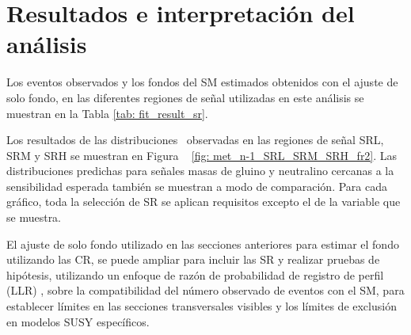 \chapter{Resultados e interpretación del análisis}




Los eventos observados y los fondos del SM estimados obtenidos con el ajuste de solo fondo, en las diferentes regiones de señal utilizadas en este análisis
se muestran en la Tabla \ref{tab: fit_result_sr}.

Los resultados de las distribuciones \met\ observadas en las regiones de señal SRL, SRM y SRH se muestran en
Figura ~ \ref{fig: met_n-1_SRL_SRM_SRH_fr2}. Las distribuciones predichas para señales masas de gluino y neutralino
 cercanas a la sensibilidad esperada también se muestran a modo de comparación. Para cada gráfico, toda la selección de SR
se aplican requisitos excepto el de la variable que se muestra.

El ajuste de solo fondo utilizado en las secciones anteriores para estimar el fondo utilizando las CR, se puede ampliar para incluir las SR y realizar pruebas de hipótesis, utilizando un enfoque de razón de probabilidad de registro de perfil (LLR) \cite{Leer: 2002hq}, sobre la compatibilidad del número observado de eventos con el SM, para establecer límites en las secciones transversales visibles y los límites de exclusión en modelos SUSY específicos.

%   



